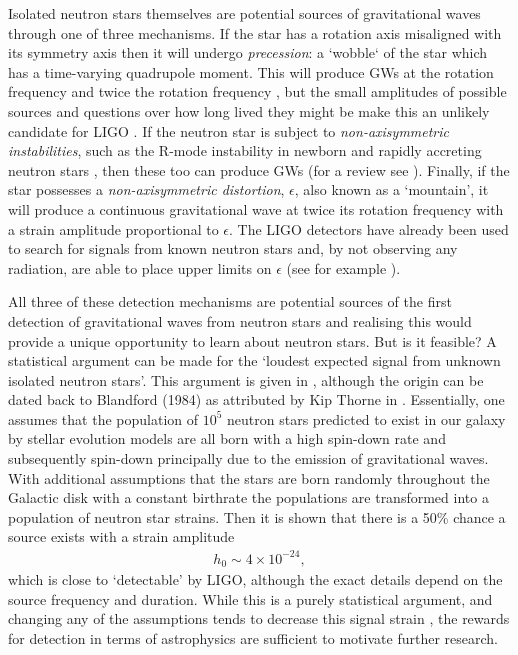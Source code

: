 Isolated neutron stars themselves are potential sources of gravitational waves
through one of three mechanisms. If the star has a rotation axis misaligned
with its symmetry axis then it will undergo \emph{precession}: a `wobble` of
the star which has a time-varying quadrupole moment. This will produce GWs at
the rotation frequency and twice the rotation frequency , but the small
amplitudes of possible sources and questions over how long lived they might be
make this an unlikely candidate for LIGO \citep{Jones2002}. If the neutron star
is subject to \emph{non-axisymmetric instabilities}, such as the R-mode
instability in newborn and rapidly accreting neutron stars
\citep{andersson2001r}, then these too can produce GWs (for a review see
\citet{andersson2003gravitational}).  Finally, if the star possesses a
\emph{non-axisymmetric distortion}, $\epsilon$, also known as a `mountain', it
will produce a continuous gravitational wave at twice its rotation frequency
with a strain amplitude proportional to $\epsilon$. The LIGO detectors have
already been used to search for signals from known neutron stars and, by not
observing any radiation, are able to place upper limits on $\epsilon$ (see for
example \citet{ligo2008, ligo2011}).

All three of these detection mechanisms are potential sources of the first detection
of gravitational waves from neutron stars and realising this would provide a
unique opportunity to learn about neutron stars. But is it feasible? A statistical
argument can be made for the `loudest expected signal from unknown isolated
neutron stars'. This argument is given in \citet{abbott2007searches},
although the origin can be dated back to Blandford (1984) as attributed by Kip Thorne
in \citet{Hawking1989}. Essentially, one assumes that the population of $10^{5}$
neutron stars predicted to exist in our galaxy by stellar evolution models are
all born with a high spin-down rate and subsequently spin-down principally due to
the emission of gravitational waves. With additional assumptions that the stars
are born randomly throughout the Galactic disk with a constant birthrate the
populations are transformed into a population of neutron star strains. Then it
is shown that there is a 50\% chance a source exists with a strain amplitude
\begin{align}
h_0 \sim 4 \times 10^{-24},
\end{align}
which is close to `detectable' by LIGO, although the exact details depend on the
source frequency and duration. While this is a purely statistical argument, and
changing any of the assumptions tends to decrease this signal strain
\citep{Prix2009}, the rewards for detection in terms of astrophysics are
sufficient to motivate further research.

